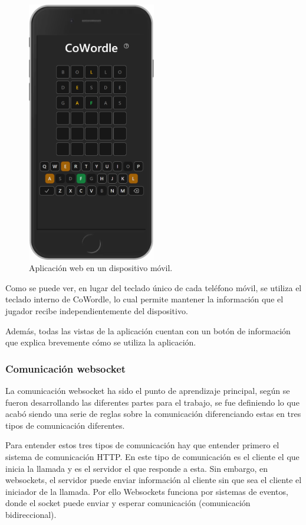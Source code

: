 \begin{figure}[H]
	\centering
	\includegraphics[clip=true,width=0.5\textwidth]{./images/design/cowordle_iphone.png}
	\caption{Aplicación web en un dispositivo móvil.}
	\label{fig:web_iphone}
\end{figure}

Como se puede ver, en lugar del teclado único de cada teléfono móvil, se utiliza el teclado interno de CoWordle, lo cual permite mantener la información que el jugador recibe independientemente del dispositivo.

Además, todas las vistas de la aplicación cuentan con un botón de información que explica brevemente cómo se utiliza la aplicación.


\subsubsection{Comunicación websocket}
\label{sec:ws_comms}
La comunicación websocket ha sido el punto de aprendizaje principal, según se fueron desarrollando las diferentes partes para el trabajo, se fue definiendo lo que acabó siendo una serie de reglas sobre la comunicación diferenciando estas en tres tipos de comunicación diferentes.

Para entender estos tres tipos de comunicación hay que entender primero el sistema de comunicación HTTP. En este tipo de comunicación es el cliente el que inicia la llamada y es el servidor el que responde a esta. Sin embargo, en websockets, el servidor puede enviar información al cliente sin que sea el cliente el iniciador de la llamada. Por ello Websockets funciona por sistemas de eventos, donde el socket puede enviar y esperar comunicación (comunicación bidireccional).

